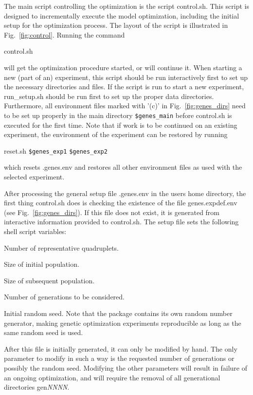 \documentclass[12pt]{article}
\newcommand{\file}{\sf}
\newcommand{\code}{\tt}
\newenvironment{plist}{\begin{list}{nofile ?}{\parsep 0mm
            \itemsep 0mm \leftmargin 35mm \labelwidth 25mm
            \rightmargin 10mm}}{\end{list}}
\newcommand{\pit}[2]{\item[{\code{#1}}\hfill]{#2}}
\begin{document}
The main script controlling the optimization is the script {\file control.sh}.
This script is designed to incrementally execute the model optimization,
including the initial setup for the optimization process. The layout of the
script is illustrated in Fig.~\ref{fig:control}. Running the command
\begin{center}
{\file control.sh}
\end{center}
\noindent
will get the optimization procedure started, or will continue it. When
starting a new (part of an) experiment, this script should be run
interactively first to set up the necessary directories and files.  If the
script is run to start a new experiment, {\file run\_setup.sh} should be run
first to set up the proper data directories. Furthermore, all environment
files marked with '(c)' in Fig.~\ref{fig:genes_dirs} need to be set up
properly in the main directory {\code \$genes\_main} before {\file control.sh}
is executed for the first time.  Note that if work is to be continued on an
existing experiment, the environment of the experiment can be restored by
running
\begin{center}
{\file reset.sh} {\code \$genes\_exp1} {\code \$genes\_exp2}
\end{center}
\noindent
which resets {\file .genes.env} and restores all other environment files as
used with the selected experiment.

After processing the general setup file {\file .genes.env} in the users home
directory, the first thing {\file control.sh} does is checking the existence
of the file {\file genes.expdef.env} (see Fig.~\ref{fig:genes_dirs}). If this
file does not exist, it is generated from interactive information provided to
{\file control.sh}. The setup file sets the following shell script variables:

\begin{plist}
\pit{\$genes\_nq   }{Number of representative quadruplets.}
\pit{\$genes\_npop0}{Size of initial population.}
\pit{\$genes\_npop }{Size of subsequent population.}
\pit{\$genes\_ngen }{Number of generations to be considered.}
\pit{\$genes\_seed }{Initial random seed. Note that the package contains its
                     own random number generator, making genetic optimization
		     experiments reproducible as long as the same random seed
		     is used.}
\end{plist}

\noindent
After this file is initially generated, it can only be modified by hand. The
only parameter to modify in such a way is the requested number of generations
or possibly the random seed. Modifying the other parameters will result in
failure of an ongoing optimization, and will require the removal of all
generational directories {\file gen{\it NNNN}}.
\end{document}
